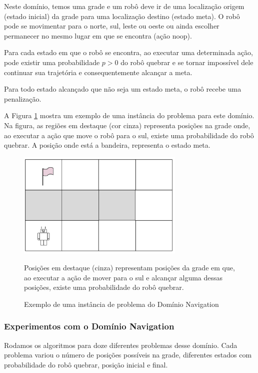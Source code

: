 \documentclass[12pt,a4paper]{article}
\begin{document}
Neste domínio, temos uma grade e um robô deve ir de uma localização origem (estado inicial) da grade para uma localização destino (estado meta).
O robô pode se movimentar para o norte, sul, leste ou oeste ou ainda escolher permanecer no mesmo lugar em que se encontra (ação noop).

Para cada estado em que o robô se encontra, ao executar uma determinada ação, pode existir uma probabilidade $p > 0$ do robô quebrar e se tornar impossível dele continuar sua trajetória e consequentemente alcançar a meta.

Para todo estado alcançado que não seja um estado meta, o robô recebe uma penalização.

A Figura \ref{fig:navigation} mostra um exemplo de uma instância do problema para este domínio. Na figura, as regiões em destaque (cor cinza) representa posições na grade onde, ao executar a ação que move o robô para o sul, existe uma probabilidade do robô quebrar. A posição onde está a bandeira, representa o estado meta.

\begin{figure}[H]%
  \centering
  \includegraphics[width=8cm]{figures/navigation2.png}
  \caption{Exemplo de uma instância de problema do Domínio Navigation}
  \scriptsize
  Posições em destaque (cinza) representam posições da grade em que, ao executar a ação de mover para o sul e alcançar alguma dessas posições, existe uma probabilidade do robô quebrar.
  \label{fig:navigation}
\end{figure}

\subsubsection{Experimentos com o Domínio Navigation}
\label{experimentosNavigation}

Rodamos os algoritmos para doze diferentes problemas desse domínio. Cada problema variou o número de posições possíveis na grade, diferentes estados com probabilidade do robô quebrar, posição inicial e final. %
\end{document}

